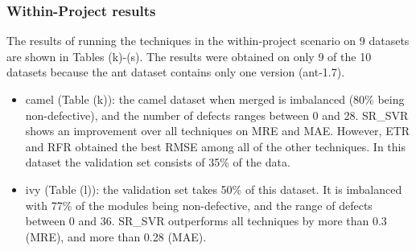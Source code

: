 \documentclass[]{article}
\begin{document}
	\FloatBarrier
	
	\subsubsection{Within-Project results}
	\FloatBarrier
	The results of running the techniques in the within-project scenario on 9 datasets are shown in Tables (k)-(s). The results were obtained on only 9 of the 10 datasets because the ant dataset contains only one version (ant-1.7). 
		\begin{itemize}
		\item camel (Table (k)): the camel dataset when merged is imbalanced (80\% being non-defective), and the number of defects ranges between 0 and 28. SR\_SVR shows an improvement over all techniques on MRE and MAE. However, ETR and RFR obtained the best RMSE among all of the other techniques. In this dataset the validation set consists of 35\% of the data.
		\item ivy (Table (l)): the validation set takes 50\% of this dataset. It is imbalanced with 77\% of the modules being non-defective, and the range of defects between 0 and 36. SR\_SVR outperforms all techniques by more than 0.3 (MRE), and more than 0.28 (MAE).
	\end{itemize}
\end{document}
